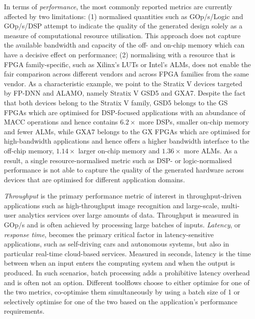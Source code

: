 \documentclass[format=acmsmall, review=false, screen=true]{acmart}
\begin{document}
In terms of \textit{performance}, the most commonly reported metrics are currently affected by two limitations: (1) normalised quantities such as GOp/s/Logic and GOp/s/DSP attempt to indicate the quality of the generated design solely as a measure of computational resource utilisation. This approach does not capture the available bandwidth and capacity of the off- and on-chip memory which can have a decisive effect on performance; (2) normalising with a resource that is FPGA family-specific, such as Xilinx's LUTs or Intel's ALMs, does not enable the fair comparison across different vendors and across FPGA families from the same vendor. As a characteristic example, we point to the Stratix V devices targeted by FP-DNN and ALAMO, namely Stratix V GSD5 and GXA7. Despite the fact that both devices belong to the Stratix V family, GSD5 belongs to the GS FPGAs which are optimised for DSP-focused applications with an abundance of MACC operations and hence contains $6.2 \times$ more DSPs, smaller on-chip memory and fewer ALMs, while GXA7 belongs to the GX FPGAs which are optimised for high-bandwidth applications and hence offers a higher bandwidth interface to the off-chip memory, $1.14 \times$ larger on-chip memory and $1.36 \times$ more ALMs. As a result, a single resource-normalised metric such as DSP- or logic-normalised performance is not able to capture the quality of the generated hardware across devices that are optimised for different application domains.



\textit{Throughput} is the primary performance metric of interest in throughput-driven applications such as high-throughput image recognition and large-scale, multi-user analytics services over large amounts of data. Throughput is measured in GOp/s and is often achieved by processing large batches of inputs. \textit{Latency}, or \textit{response time}, becomes the primary critical factor in latency-sensitive applications, such as self-driving cars and autonomous systems, but also in particular real-time cloud-based services. Measured in seconds, latency is the time between when an input enters the computing system and when the output is produced. In such scenarios, batch processing adds a prohibitive latency overhead and is often not an option. Different toolflows choose to either optimise for one of the two metrics, co-optimise them simultaneously by using a batch size of 1 or selectively optimise for one of the two based on the application's performance requirements.
\end{document}

